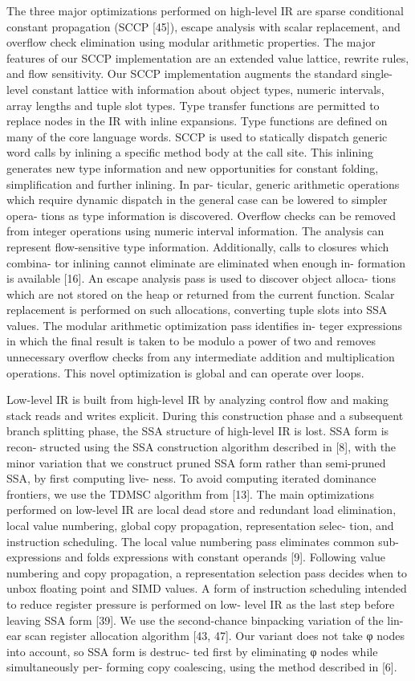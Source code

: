 The three major optimizations performed on high-level IR are sparse conditional
constant propagation (SCCP [45]), escape analysis with scalar replacement, and
overﬂow check elimination using modular arithmetic properties.  The major
features of our SCCP implementation are an extended value lattice, rewrite
rules, and ﬂow sensitivity.  Our SCCP implementation augments the standard
single- level constant lattice with information about object types, numeric
intervals, array lengths and tuple slot types. Type transfer functions are
permitted to replace nodes in the IR with inline expansions. Type functions are
deﬁned on many of the core language words.  SCCP is used to statically dispatch
generic word calls by inlining a speciﬁc method body at the call site. This
inlining generates new type information and new opportunities for constant
folding, simpliﬁcation and further inlining. In par- ticular, generic
arithmetic operations which require dynamic dispatch in the general case can be
lowered to simpler opera- tions as type information is discovered. Overﬂow
checks can be removed from integer operations using numeric interval
information. The analysis can represent ﬂow-sensitive type information.
Additionally, calls to closures which combina- tor inlining cannot eliminate
are eliminated when enough in- formation is available [16].  An escape analysis
pass is used to discover object alloca- tions which are not stored on the heap
or returned from the current function. Scalar replacement is performed on such
allocations, converting tuple slots into SSA values.  The modular arithmetic
optimization pass identiﬁes in- teger expressions in which the ﬁnal result is
taken to be modulo a power of two and removes unnecessary overﬂow checks from
any intermediate addition and multiplication operations. This novel
optimization is global and can operate over loops.

Low-level IR is built from high-level IR by analyzing control ﬂow and making
stack reads and writes explicit. During this construction phase and a
subsequent branch splitting phase, the SSA structure of high-level IR is lost.
SSA form is recon- structed using the SSA construction algorithm described in
[8], with the minor variation that we construct pruned SSA form rather than
semi-pruned SSA, by ﬁrst computing live- ness. To avoid computing iterated
dominance frontiers, we use the TDMSC algorithm from [13].  The main
optimizations performed on low-level IR are local dead store and redundant load
elimination, local value numbering, global copy propagation, representation
selec- tion, and instruction scheduling.  The local value numbering pass
eliminates common sub- expressions and folds expressions with constant operands
[9]. Following value numbering and copy propagation, a representation selection
pass decides when to unbox ﬂoating point and SIMD values. A form of instruction
scheduling intended to reduce register pressure is performed on low- level IR
as the last step before leaving SSA form [39].  We use the second-chance
binpacking variation of the lin- ear scan register allocation algorithm [43,
47]. Our variant does not take φ nodes into account, so SSA form is destruc-
ted ﬁrst by eliminating φ nodes while simultaneously per- forming copy
coalescing, using the method described in [6].
